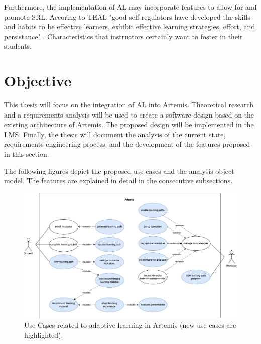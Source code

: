 \documentclass[a4paper,12pt,twoside]{article}
\begin{document}
Furthermore, the implementation of \ac{AL} may incorporate features to allow for and promote \ac{SRL}. Accoring to TEAL
"good self-regulators have developed the skills and habits to be effective learners, exhibit effective learning strategies, effort, and persistance" \cite{no2012self}.
Characteristics that instructors certainly want to foster in their students.


\section{Objective}

This thesis will focus on the integration of \ac{AL} into Artemis.
Theoretical research and a requirements analysis will be used to create a software design based on the existing architecture of Artemis. The proposed
design will be implemented in the \ac{LMS}. Finally, the thesis will document the analysis of the current state, requirements engineering process,
and the development of the features proposed in this section.

The following figures depict the proposed use cases and the analysis object model. The features are explained in detail in the consecutive subsections.

\begin{figure}[h!]
        \centering
        \includegraphics[width=\linewidth]{figures/UseCases(3).png}
        \caption{Use Cases related to adaptive learning in Artemis (new use cases are highlighted).}
        \label{fig:UseCases}
\end{figure}
\end{document}
